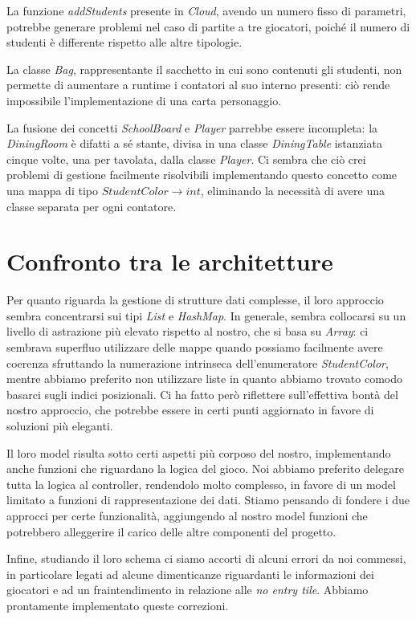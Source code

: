 \documentclass[12pt]{article}
\begin{document}
La funzione \emph{addStudents} presente in \emph{Cloud}, avendo un numero fisso di parametri, potrebbe generare problemi nel caso di partite a tre
giocatori, poiché il numero di studenti è differente rispetto alle altre tipologie.

La classe \emph{Bag}, rappresentante il sacchetto in cui sono contenuti gli studenti, non permette di aumentare a runtime i contatori al suo interno
presenti: ciò rende impossibile l'implementazione di una carta personaggio.

La fusione dei concetti \emph{SchoolBoard} e \emph{Player} parrebbe essere incompleta: la \emph{DiningRoom} è difatti a sé stante, divisa in una classe
\emph{DiningTable} istanziata cinque volte, una per tavolata, dalla classe \emph{Player}. Ci sembra che ciò crei problemi di gestione facilmente
risolvibili implementando questo concetto come una mappa di tipo \(StudentColor \to int\), eliminando la necessità di avere una classe separata per ogni
contatore.

\section{Confronto tra le architetture}

Per quanto riguarda la gestione di strutture dati complesse, il loro approccio sembra concentrarsi sui tipi \emph{List} e \emph{HashMap}. In generale,
sembra collocarsi su un livello di astrazione più elevato rispetto al nostro, che si basa su \emph{Array}: ci sembrava superfluo utilizzare delle mappe
quando possiamo facilmente avere coerenza sfruttando la numerazione intrinseca dell'enumeratore \emph{StudentColor}, mentre abbiamo preferito non utilizzare
liste in quanto abbiamo trovato comodo basarci sugli indici posizionali. Ci ha fatto però riflettere sull'effettiva bontà del nostro approccio, che
potrebbe essere in certi punti aggiornato in favore di soluzioni più eleganti.

Il loro model risulta sotto certi aspetti più corposo del nostro, implementando anche funzioni che riguardano la logica del gioco. Noi abbiamo
preferito delegare tutta la logica al controller, rendendolo molto complesso, in favore di un model limitato a funzioni di rappresentazione dei dati.
Stiamo pensando di fondere i due approcci per certe funzionalità, aggiungendo al nostro model funzioni che potrebbero alleggerire il carico delle altre
componenti del progetto.

Infine, studiando il loro schema ci siamo accorti di alcuni errori da noi commessi, in particolare legati ad alcune dimenticanze riguardanti le
informazioni dei giocatori e ad un fraintendimento in relazione alle \emph{no entry tile}. Abbiamo prontamente implementato queste correzioni.
\end{document}
